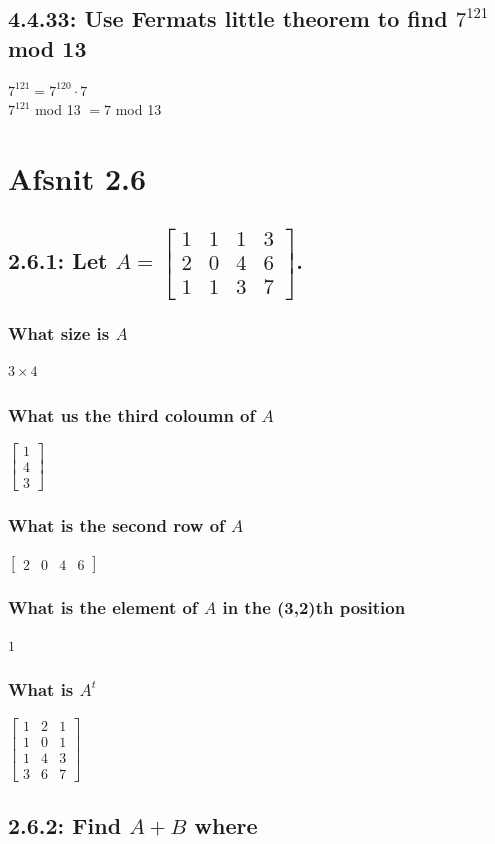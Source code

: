 \documentclass[12pt, a4paper]{report}
\begin{document}
			\subsection{4.4.33: Use Fermats little theorem to find $7^{121}$ mod 13}
				$7^{121}=7^{120}\cdot 7$\\
				$7^{121}$ mod 13 $=7$ mod 13
		\section{Afsnit 2.6}
			\subsection{2.6.1: Let $A=\begin{bmatrix}1&1&1&3\\2&0&4&6\\1&1&3&7\end{bmatrix}$.}
				\subsubsection{What size is $A$}
					$3\times 4$
				\subsubsection{What us the third coloumn of $A$}
					$\begin{bmatrix}1\\4\\3\end{bmatrix}$
				\subsubsection{What is the second row of $A$}
					$\begin{bmatrix}2&0&4&6\end{bmatrix}$
				\subsubsection{What is the element of $A$ in the (3,2)th position}
					$1$
				\subsubsection{What is $A^t$}
					$\begin{bmatrix}1&2&1\\1&0&1\\1&4&3\\3&6&7\end{bmatrix}$
			\subsection{2.6.2: Find $A+B$ where}
\end{document}
